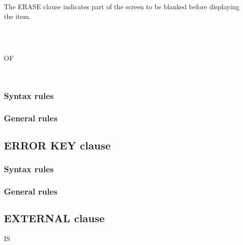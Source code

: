 The ERASE clause indicates part of the screen to be blanked before displaying the item.

\begin{syntax}
  \begin{1=}
     \\
     \\

    \begin{0-1}
        OF
    \end{0-1}
    \begin{1=}
       \\
    \end{1=}
  \end{1=}
\end{syntax}

\subsubsection{Syntax rules}

\subsubsection{General rules}

\subsection{ERROR KEY clause}

\begin{syntax}[\deletedcolour]
\end{syntax}

\subsubsection{Syntax rules}

\subsubsection{General rules}

\subsection{EXTERNAL clause}

\begin{syntax}
  IS 
  \begin{0-1}
     \literal
  \end{0-1}
\end{syntax}


